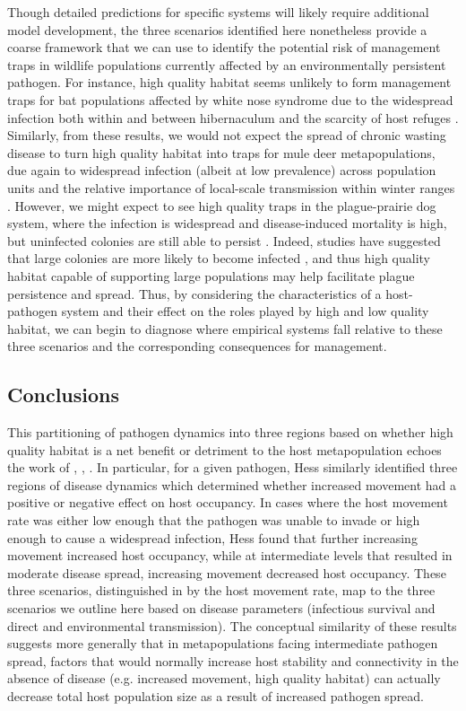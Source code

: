 \documentclass{article}
\begin{document}
Though detailed predictions for specific systems will likely require additional model development, the three scenarios identified here nonetheless provide a coarse framework that we can use to identify the potential risk of management traps in wildlife populations currently affected by an environmentally persistent pathogen.
For instance, high quality habitat seems unlikely to form management traps for bat populations affected by white nose syndrome due to the widespread infection both within and between hibernaculum and the scarcity of host refuges \cite{Langwig2014, ORegan2015}.
Similarly, from these results, we would not expect the spread of chronic wasting disease to turn high quality habitat into traps for mule deer metapopulations, due again to widespread infection (albeit at low prevalence) across population units \cite{Conner2004} and the relative importance of local-scale transmission within winter ranges \cite{Farnsworth2006}.
However, we might expect to see high quality traps in the plague-prairie dog system, where the infection is widespread and disease-induced mortality is high, but uninfected colonies are still able to persist \cite{Stapp2004}.
Indeed, studies have suggested that large colonies are more likely to become infected \cite{Snall2008}, and thus high quality habitat capable of supporting large populations may help facilitate plague persistence and spread.
Thus, by considering the characteristics of a host-pathogen system and their effect on the roles played by high and low quality habitat, we can begin to diagnose where empirical systems fall relative to these three scenarios and the corresponding consequences for management.
 
\subsection*{Conclusions}  

This partitioning of pathogen dynamics into three regions based on whether high quality habitat is a net benefit or detriment to the host metapopulation echoes the work of \cite{Hess1996}, \cite{Gog2002}, \cite{Park2012}.
In particular, for a given pathogen, Hess \cite{Hess1996} similarly identified three regions of disease dynamics which determined whether increased movement had a positive or negative effect on host occupancy.  
In cases where the host movement rate was either low enough that the pathogen was unable to invade or high enough to cause a widespread infection, Hess found that further increasing movement increased host occupancy, while at intermediate levels that resulted in moderate disease spread, increasing movement decreased host occupancy.
These three scenarios, distinguished in \cite{Hess1996} by the host movement rate, map to the three scenarios we outline here based on disease parameters (infectious survival and direct and environmental transmission).
The conceptual similarity of these results suggests more generally that in metapopulations facing intermediate pathogen spread, factors that would normally increase host stability and connectivity in the absence of disease (e.g. increased movement, high quality habitat) can actually decrease total host population size as a result of increased pathogen spread.
\end{document}
